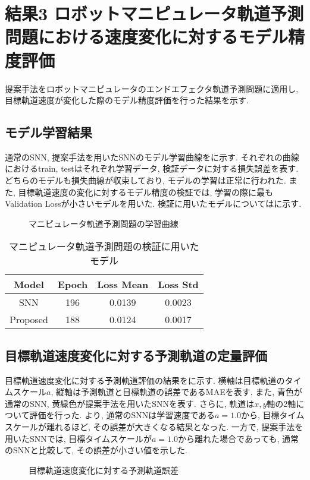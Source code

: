 \section{結果3 ロボットマニピュレータ軌道予測問題における速度変化に対するモデル精度評価} \label{sec:result3}
提案手法をロボットマニピュレータのエンドエフェクタ軌道予測問題に適用し, 目標軌道速度が変化した際のモデル精度評価を行った結果を示す.

\subsection{モデル学習結果}
通常のSNN, 提案手法を用いたSNNのモデル学習曲線をに示す.
それぞれの曲線におけるtrain, testはそれぞれ学習データ, 検証データに対する損失誤差を表す.
どちらのモデルも損失曲線が収束しており, モデルの学習は正常に行われた.
また, 目標軌道速度の変化に対するモデル精度の検証では, 学習の際に最もValidation Lossが小さいモデルを用いた.
検証に用いたモデルについてはに示す.
\begin{figure}[htb]
    \centering
    
    \caption{マニピュレータ軌道予測問題の学習曲線}
    \label{fig:result3:losscurve}
\end{figure}

\begin{table}[htb]
    \centering
    \caption{マニピュレータ軌道予測問題の検証に用いたモデル}
    \label{tab:result3:model:parameter}
    \begin{tabular}{cccc}
        \hline
        \textbf{Model}& \textbf{Epoch} & \textbf{Loss Mean} & \textbf{Loss Std}\\
        \hline
        SNN &  196 & 0.0139 & 0.0023\\ %
        Proposed & 188 & 0.0124 & 0.0017\\
        \hline
    \end{tabular}
\end{table}
\clearpage


\subsection{目標軌道速度変化に対する予測軌道の定量評価}
目標軌道速度変化に対する予測軌道評価の結果をに示す.
横軸は目標軌道のタイムスケール$a$, 縦軸は予測軌道と目標軌道の誤差であるMAEを表す.
また, 青色が通常のSNN, 黄緑色が提案手法を用いたSNNを表す.
さらに, 軌道は$x, y$軸の2軸について評価を行った.
より, 通常のSNNは学習速度である$a=1.0$から, 目標タイムスケールが離れるほど, その誤差が大きくなる結果となった.
一方で, 提案手法を用いたSNNでは, 目標タイムスケールが$a=1.0$から離れた場合であっても, 通常のSNNと比較して, その誤差が小さい値を示した.
\begin{figure}[htb]
    \centering
    
    \caption{目標軌道速度変化に対する予測軌道誤差}
    \label{fig:result3:trjerror}
\end{figure}


